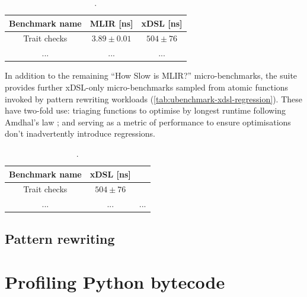\begin{table}[H]
  \caption{.}
  \label{tab:ubenchmark-remaining-mlir}
  \centering
  \begin{tabular}{ccc}
    \toprule
    \textbf{Benchmark name} & \textbf{MLIR [ns]} & \textbf{xDSL [ns]}\\
    \midrule
    Trait checks & $3.89 \pm 0.01$ & $504 \pm 76$ \\
    ... & ... & ... \\
    \bottomrule
  \end{tabular}
\end{table}


In addition to the remaining ``How Slow is MLIR?'' micro-benchmarks, the suite provides further xDSL-only micro-benchmarks sampled from atomic functions invoked by pattern rewriting workloads (\autoref{tab:ubenchmark-xdsl-regression}).
These have two-fold use: triaging functions to optimise by longest runtime following Amdhal's law \cite{amdahlValiditySingleProcessor1967}; and serving as a metric of performance to ensure optimisations don't inadvertently introduce regressions.

\begin{table}[H]
  \caption{.}
  \label{tab:ubenchmark-xdsl-regression}
  \centering
  \begin{tabular}{ccc}
    \toprule
    \textbf{Benchmark name} & \textbf{xDSL [ns]}\\
    \midrule
    Trait checks & $504 \pm 76$ \\
    ... & ... & ... \\
    \bottomrule
  \end{tabular}
\end{table}



\section{Pattern rewriting}



















\chapter{Profiling Python bytecode} %







